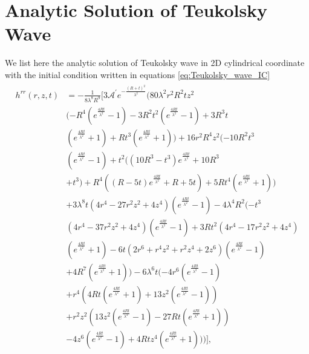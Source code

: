 
\chapter{Analytic Solution of Teukolsky Wave}
\label{A3}

We list here the analytic solution of Teukolsky wave in 2D cylindrical coordinate with the initial condition written in equations \ref{eq:Teukolsky_wave_IC}
\begin{align}
\begin{split}
        h^{rr}(r,z,t) &=
-\frac{1}{8 \lambda ^8 R^9}\bigg[3 \mathcal{A}^\prime e^{-\frac{(R+t)^2}{\lambda ^2}} (80 \lambda ^2 r^2 R^2 t z^2 \\
& (-R^4 (e^{\frac{4 R t}{\lambda ^2}}-1)-3 R^2 t^2 (e^{\frac{4 R t}{\lambda ^2}}-1)+3 R^3 t \\
& (e^{\frac{4 R t}{\lambda ^2}}+1)+R t^3 (e^{\frac{4 R t}{\lambda ^2}}+1))+16 r^2 R^4 z^2 (-10 R^2 t^3 \\
& (e^{\frac{4 R t}{\lambda ^2}}-1)+t^2 ((10 R^3-t^3) e^{\frac{4 R t}{\lambda ^2}}+10 R^3 \\
& +t^3)+R^4 ((R-5 t) e^{\frac{4 R t}{\lambda ^2}}+R+5 t)+5 R t^4 (e^{\frac{4 R t}{\lambda ^2}}+1)) \\
& +3 \lambda ^8 t (4 r^4-27 r^2 z^2+4 z^4) (e^{\frac{4 R t}{\lambda ^2}}-1)-4 \lambda ^4 R^2 (-t^3 \\
& (4 r^4-37 r^2 z^2+4 z^4) (e^{\frac{4 R t}{\lambda ^2}}-1)+3 R t^2 (4 r^4-17 r^2 z^2+4 z^4) \\
& (e^{\frac{4 R t}{\lambda ^2}}+1)-6 t (2 r^6+r^4 z^2+r^2 z^4+2 z^6) (e^{\frac{4 R t}{\lambda ^2}}-1) \\
& +4 R^7 (e^{\frac{4 R t}{\lambda ^2}}+1))-6 \lambda ^6 t (-4 r^6 (e^{\frac{4 R t}{\lambda ^2}}-1) \\
& +r^4 (4 R t (e^{\frac{4 R t}{\lambda ^2}}+1)+13 z^2 (e^{\frac{4 R t}{\lambda ^2}}-1)) \\
& +r^2 z^2 (13 z^2 (e^{\frac{4 R t}{\lambda ^2}}-1)-27 R t (e^{\frac{4 R t}{\lambda ^2}}+1)) \\
& -4 z^6 (e^{\frac{4 R t}{\lambda ^2}}-1)+4 R t z^4 (e^{\frac{4 R t}{\lambda ^2}}+1)))\bigg],
\end{split}
\end{align}
